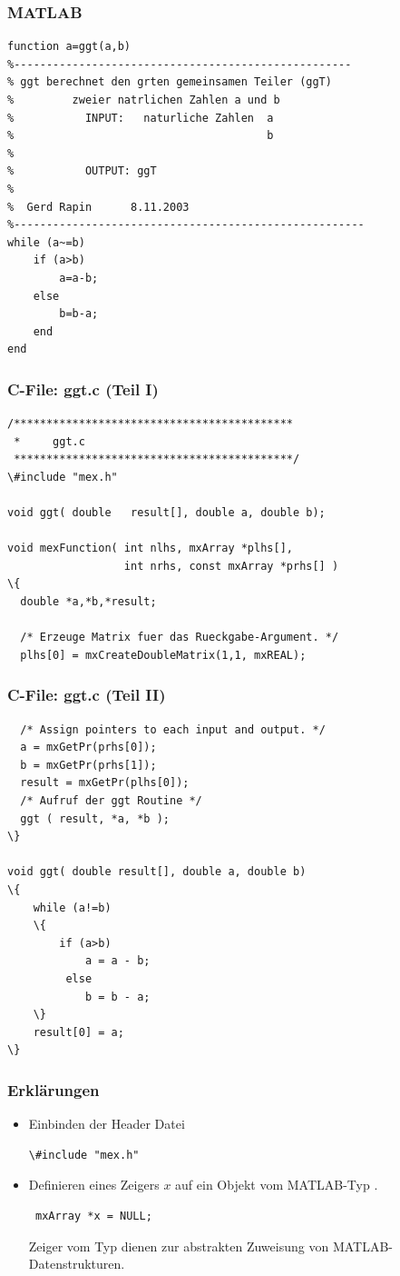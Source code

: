\begin{frame}[fragile]\frametitle{MATLAB}
\begin{lstlisting}
function a=ggt(a,b)
%----------------------------------------------------
% ggt berechnet den grten gemeinsamen Teiler (ggT)    
%         zweier natrlichen Zahlen a und b
%           INPUT:   naturliche Zahlen  a
%                                       b
%                 
%           OUTPUT: ggT
%                   
%  Gerd Rapin      8.11.2003
%------------------------------------------------------
while (a~=b)
    if (a>b)
        a=a-b;
    else
        b=b-a;
    end
end
\end{lstlisting}
\end{frame}
%
% 
\begin{frame}[fragile]\frametitle{C-File: ggt.c (Teil I)}
\begin{lstlisting}
/*******************************************
 *     ggt.c  
 *******************************************/
\#include "mex.h"

void ggt( double   result[], double a, double b);

void mexFunction( int nlhs, mxArray *plhs[],
                  int nrhs, const mxArray *prhs[] )
\{
  double *a,*b,*result;
  
  /* Erzeuge Matrix fuer das Rueckgabe-Argument. */
  plhs[0] = mxCreateDoubleMatrix(1,1, mxREAL);  
\end{lstlisting}
\end{frame}
%
% 
\begin{frame}[fragile]\frametitle{C-File: ggt.c (Teil II)}
\begin{lstlisting}
  /* Assign pointers to each input and output. */
  a = mxGetPr(prhs[0]);
  b = mxGetPr(prhs[1]);
  result = mxGetPr(plhs[0]);  
  /* Aufruf der ggt Routine */
  ggt ( result, *a, *b );
\}

void ggt( double result[], double a, double b)
\{
    while (a!=b)
    \{
        if (a>b) 
            a = a - b;
         else
            b = b - a;      
    \}
    result[0] = a;
\}
\end{lstlisting}
\end{frame}
%
% 
\begin{frame}[fragile]\frametitle{Erkl\"arungen}
\begin{itemize}
\item Einbinden der Header Datei
\begin{lstlisting}
\#include "mex.h"
\end{lstlisting}
\item Definieren eines Zeigers $x$ auf ein Objekt vom MATLAB-Typ . 
\begin{lstlisting}
 mxArray *x = NULL;
\end{lstlisting}
Zeiger vom Typ  dienen zur abstrakten Zuweisung von MATLAB-Datenstrukturen.
\end{itemize}
\end{frame}
